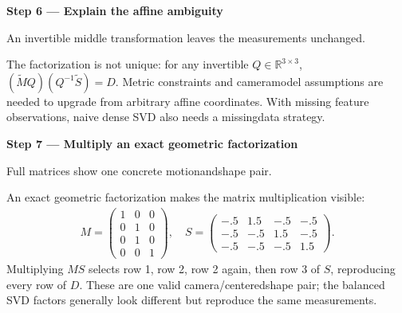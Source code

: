 \documentclass[letterpaper,11pt,english,openany,oneside]{jupyterBook}
\begin{document}
\par

\par\medskip{}
{\color{QuizStepRed}\bfseries Step 6 — Explain the affine ambiguity}\par\smallskip

\sphinxAtStartPar
{} An invertible middle transformation leaves the measurements unchanged.

\sphinxAtStartPar
The factorization is not unique: for any invertible {\color{QuizMathBlue} \(Q\in\mathbb R^{3\times3}\)}, {\color{QuizMathBlue} \((\widetilde M Q)(Q^{-1}\widetilde S)=D\)}. Metric constraints and camera\sphinxhyphen{}model assumptions are needed to upgrade from arbitrary affine coordinates. With missing feature observations, naive dense SVD also needs a missing\sphinxhyphen{}data strategy.

\par

\par\medskip{}
{\color{QuizStepRed}\bfseries Step 7 — Multiply an exact geometric factorization}\par\smallskip

\sphinxAtStartPar
{} Full matrices show one concrete motion\sphinxhyphen{}and\sphinxhyphen{}shape pair.

\sphinxAtStartPar
An exact geometric factorization makes the matrix multiplication visible:
{\color{QuizMathBlue} \begin{equation*}
\begin{split}
M=\begin{pmatrix}1&0&0\\0&1&0\\0&1&0\\0&0&1\end{pmatrix},\quad
S=\begin{pmatrix}-.5&1.5&-.5&-.5\\-.5&-.5&1.5&-.5\\-.5&-.5&-.5&1.5\end{pmatrix}.
\end{split}
\end{equation*}}
\sphinxAtStartPar
Multiplying {\color{QuizMathBlue} \(MS\)} selects row 1, row 2, row 2 again, then row 3 of {\color{QuizMathBlue} \(S\)}, reproducing every row of {\color{QuizMathBlue} \(D\)}. These are one valid camera/centered\sphinxhyphen{}shape pair; the balanced SVD factors generally look different but reproduce the same measurements.
\end{document}
